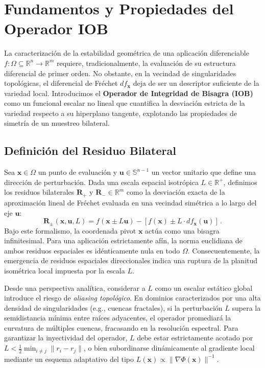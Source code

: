 \documentclass[11pt]{article}
\begin{document}
\section{Fundamentos y Propiedades del Operador IOB}
\label{sec:fundamentos}

La caracterización de la estabilidad geométrica de una aplicación diferenciable $f: \Omega \subseteq \mathbb{R}^n \to \mathbb{R}^m$ requiere, tradicionalmente, la evaluación de su estructura diferencial de primer orden. No obstante, en la vecindad de singularidades topológicas, el diferencial de Fréchet $df_{\mathbf{x}}$ deja de ser un descriptor suficiente de la variedad local. Introducimos el \textbf{Operador de Integridad de Bisagra (IOB)} como un funcional escalar no lineal que cuantifica la desviación estricta de la variedad respecto a su hiperplano tangente, explotando las propiedades de simetría de un muestreo bilateral.

\subsection{Definición del Residuo Bilateral}

Sea $\mathbf{x} \in \Omega$ un punto de evaluación y $\mathbf{u} \in \mathbb{S}^{n-1}$ un vector unitario que define una dirección de perturbación. Dada una escala espacial isotrópica $L \in \mathbb{R}^+$, definimos los residuos bilaterales $\mathbf{R}_+$ y $\mathbf{R}_- \in \mathbb{R}^m$ como la desviación exacta de la aproximación lineal de Fréchet evaluada en una vecindad simétrica a lo largo del eje $\mathbf{u}$:
\begin{equation}
    \mathbf{R}_{\pm}(\mathbf{x}, \mathbf{u}, L) = f(\mathbf{x} \pm L\mathbf{u}) - [f(\mathbf{x}) \pm L \cdot df_{\mathbf{x}}(\mathbf{u})] \,.
\end{equation}
Bajo este formalismo, la coordenada pivot $\mathbf{x}$ actúa como una bisagra infinitesimal. Para una aplicación estrictamente afín, la norma euclidiana de ambos residuos espaciales es idénticamente nula en todo $\Omega$. Consecuentemente, la emergencia de residuos espaciales direccionales indica una ruptura de la planitud isométrica local impuesta por la escala $L$.

\begin{remark}
Desde una perspectiva analítica, considerar a $L$ como un escalar estático global introduce el riesgo de \textit{aliasing topológico}. En dominios caracterizados por una alta densidad de singularidades (e.g., cuencas fractales), si la perturbación $L$ supera la semidistancia mínima entre raíces adyacentes, el operador promediará la curvatura de múltiples cuencas, fracasando en la resolución espectral. Para garantizar la inyectividad del operador, $L$ debe estar estrictamente acotado por $L < \frac{1}{2} \min_{i \neq j} \|r_i - r_j\|$, o bien subordinarse dinámicamente al gradiente local mediante un esquema adaptativo del tipo $L(\mathbf{x}) \propto \|\nabla \Phi(\mathbf{x})\|^{-1}$.
\end{remark}
\end{document}
